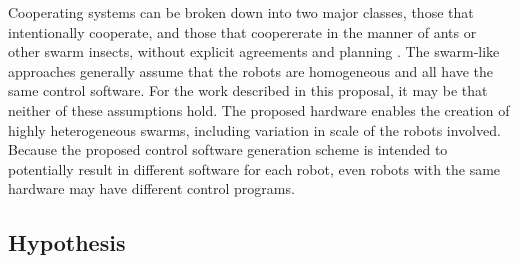 \documentclass[]{article}
\begin{document}
Cooperating systems can be broken down into two major classes, those that intentionally cooperate, and those that coopererate in the manner of ants or other swarm insects, without explicit agreements and planning \cite{parker1998alliance}.
The swarm-like approaches generally assume that the robots are homogeneous and all have the same control software. 
For the work described in this proposal, it may be that neither of these assumptions hold. 
The proposed hardware enables the creation of highly heterogeneous swarms, including variation in scale of the robots involved. 
Because the proposed control software generation scheme is intended to potentially result in different software for each robot, even robots with the same hardware may have different control programs. 

\subsection{Hypothesis}
\end{document}
